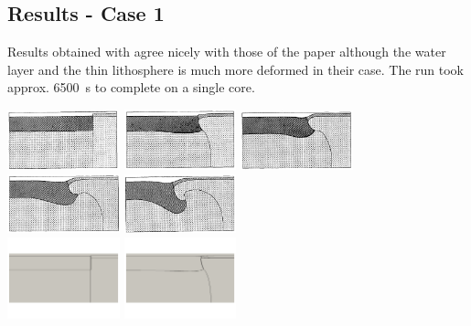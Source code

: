 \newpage

\subsection*{Results - Case 1}

Results obtained with \aspect agree nicely with those of the paper
although the water layer and the thin lithosphere is much more 
deformed in their case. The run took approx. 6500~s to complete on a single core.

\begin{center}
\includegraphics[width=3.25cm]{python_codes/fieldstone_118/images/case1/a}
\includegraphics[width=3.25cm]{python_codes/fieldstone_118/images/case1/b}
\includegraphics[width=3.25cm]{python_codes/fieldstone_118/images/case1/c}
\includegraphics[width=3.25cm]{python_codes/fieldstone_118/images/case1/d}
\includegraphics[width=3.25cm]{python_codes/fieldstone_118/images/case1/e}\\
\includegraphics[width=3.25cm]{python_codes/fieldstone_118/results/case1/a}
\includegraphics[width=3.25cm]{python_codes/fieldstone_118/results/case1/b}

\end{center}

